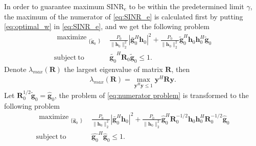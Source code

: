 \documentclass[conference]{IEEEtran}
\begin{document}
In order to guarantee maximum $\mathrm{SINR}_e$ to be within the predetermined limit $\gamma$, the maximum of the numerator of \eqref{eq:SINR_e} is calculated first by putting \eqref{eq:optimal_w} in \eqref{eq:SINR_e}, and we get the following problem
\begin{equation}\label{eq:numerator problem}
\begin{array}{ll}
\begin{split}
\mathop{\text{maximize}}_{\substack{\{\tilde{\mathbf{g}}_{0}}\}} 
\end{split}  
& \frac{P_0}{\|\mathbf{h}_0\|_2^2}|\bar{\mathbf{g}}_0^H\mathbf{h}_0|^2 +\frac{P_0}{\|\mathbf{h}_0\|_2^2} \tilde{\mathbf{g}}_0^H\mathbf{h}_0\mathbf{h}_0^H\tilde{\mathbf{g}}_0\\
\mathrm{subject~to} &\tilde{\mathbf{g}_0}^H\mathbf{R}_0\tilde{\mathbf{g}}_0 \leq 1.
\end{array}
\end{equation}
Denote $\lambda_{max}(\mathbf{R})$ the largest eigenvalue of matrix $\mathbf{R}$, then
\begin{eqnarray}
\lambda_{max}(\mathbf{R})= \max_{\mathbf{y}^H\mathbf{y} \leq 1} \mathbf{y}^H\mathbf{R}\mathbf{y}.
\end{eqnarray}
Let $\mathbf{R}_0^{1/2}\tilde{\mathbf{g}}_0 = \hat{\mathbf{g}}_0$, the problem of \eqref{eq:numerator problem} is transformed to the following problem
\begin{equation}\label{eq:numerator problem1}
\begin{array}{ll}
\begin{split}
\mathop{\text{maximize}}_{\substack{\{\hat{\mathbf{g}}_{0}}\}} 
\end{split}  
& \frac{P_0}{\|\mathbf{h}_0\|_2^2}|\bar{\mathbf{g}}_0^H\mathbf{h}_0|^2 +\frac{P_0}{\|\mathbf{h}_0\|_2^2} \hat{\mathbf{g}}_0^H\mathbf{R}_0^{-1/2}\mathbf{h}_0\mathbf{h}_0^H\mathbf{R}_0^{-1/2}\hat{\mathbf{g}}_0\\
\mathrm{subject~to} &\hat{\mathbf{g}_0}^H\hat{\mathbf{g}}_0 \leq 1.
\end{array}
\end{equation}
\end{document}
